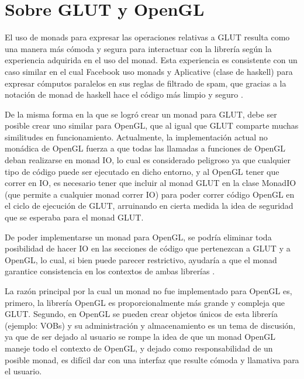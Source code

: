 \section{Sobre GLUT y OpenGL}

El uso de monads para expresar las operaciones relativas a GLUT resulta como una manera más cómoda y segura para interactuar con la librería según la experiencia adquirida en el uso del monad. Esta experiencia es consistente con un caso similar en el cual Facebook uso monads y Aplicative (clase de haskell) para expresar cómputos paralelos en sus reglas de filtrado de spam, que gracias a la notación de monad de haskell hace el código más limpio y seguro \cite{marlow2014there} \cite{Facebook:Fighting} \cite{Facebook:sourcing}.

De la misma forma en la que se logró crear un monad para GLUT,  debe ser posible crear uno similar para OpenGL, que al igual que GLUT comparte muchas similitudes en funcionamiento. Actualmente, la implementación actual no monádica de OpenGL fuerza a que todas las llamadas a funciones de OpenGL deban realizarse en monad IO, lo cual es considerado peligroso ya que cualquier tipo de código puede ser ejecutado en dicho entorno, y al OpenGL tener que correr en IO, es necesario tener que incluir al monad GLUT en la clase MonadIO (que permite a cualquier monad correr IO) para poder correr código OpenGL en el ciclo de ejecución de GLUT, arruinando en cierta medida la idea de seguridad que se esperaba para el monad GLUT.

De poder implementarse un monad para OpenGL, se podría eliminar toda posibilidad de hacer IO en las secciones de código que pertenezcan a GLUT y a OpenGL, lo cual, si bien puede parecer restrictivo, ayudaría a que el monad garantice consistencia en los contextos de ambas librerías \cite{hughes2000generalising}.

La razón principal por la cual un monad no fue implementado para OpenGL es, primero, la librería OpenGL es proporcionalmente más grande y compleja que GLUT. Segundo, en OpenGL se pueden crear objetos únicos de esta librería (ejemplo: VOBs) y su administración y almacenamiento es un tema de discusión, ya que de ser dejado al usuario se rompe la idea de que un monad OpenGL maneje todo el contexto de OpenGL, y dejado como responsabilidad de un posible monad, es difícil dar con una interfaz que resulte cómoda y llamativa para el usuario.
